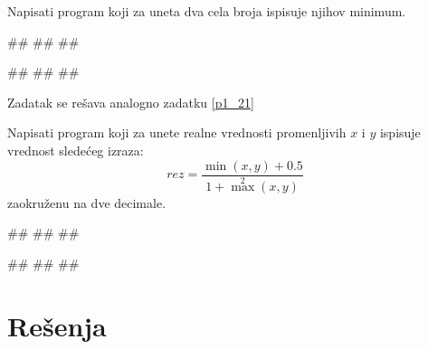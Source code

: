 \begin{Exercise}[label=p1_21]
Napisati program koji za uneta dva cela broja ispisuje njihov minimum. 

\begin{miditest}
\begin{upotreba}{1}
#\naslovInt#
##
##
\end{upotreba}
\end{miditest}
\begin{miditest}
\begin{upotreba}{2}
#\naslovInt#
##
##
\end{upotreba}
\end{miditest}

\end{Exercise}
\begin{Answer}[ref=p1_21]
Zadatak se rešava analogno zadatku \ref{p1_21}
\end{Answer}

\begin{Exercise}[label=p1_22]
Napisati program koji za unete realne vrednosti promenljivih $x$ i
$y$ ispisuje vrednost sledećeg izraza:
$$rez = \frac{\min(x, y) + 0.5}{1 + \max^2(x, y)}$$ zaokruženu na dve decimale. 

\begin{miditest}
\begin{upotreba}{1}
#\naslovInt#
##
##
\end{upotreba}
\end{miditest}
\begin{miditest}
\begin{upotreba}{1}
#\naslovInt#
##
##
\end{upotreba}
\end{miditest}

\end{Exercise}
\begin{Answer}[ref=p1_22]
\end{Answer}


\ifresenja
\section{Rešenja}
\shipoutAnswer
\fi
